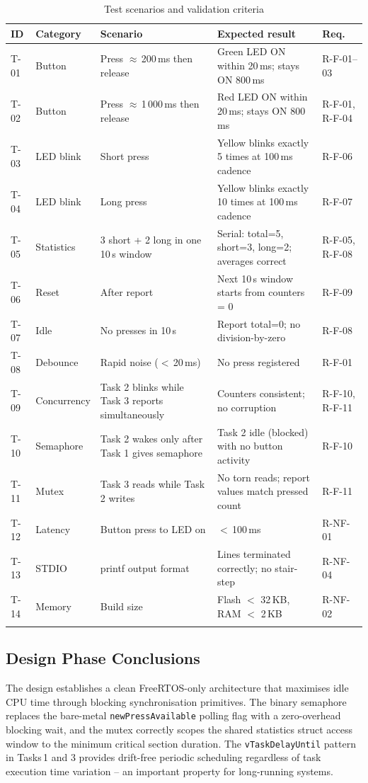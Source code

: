 \documentclass[12pt]{article}
\begin{document}
\begin{longtable}{p{1.0cm} p{2.3cm} p{4.5cm} p{4.5cm} p{1.0cm}}
\toprule
\textbf{ID} & \textbf{Category} & \textbf{Scenario} & \textbf{Expected result} & \textbf{Req.} \\
\midrule
\endfirsthead
T-01 & Button & Press $\approx$\,200\,ms then release & Green LED ON within 20\,ms; stays ON 800\,ms & R-F-01--03 \\
T-02 & Button & Press $\approx$\,1\,000\,ms then release & Red LED ON within 20\,ms; stays ON 800\,ms & R-F-01, R-F-04 \\
T-03 & LED blink & Short press & Yellow blinks exactly 5 times at 100\,ms cadence & R-F-06 \\
T-04 & LED blink & Long press & Yellow blinks exactly 10 times at 100\,ms cadence & R-F-07 \\
T-05 & Statistics & 3 short + 2 long in one 10\,s window & Serial: total=5, short=3, long=2; averages correct & R-F-05, R-F-08 \\
T-06 & Reset & After report & Next 10\,s window starts from counters = 0 & R-F-09 \\
T-07 & Idle & No presses in 10\,s & Report total=0; no division-by-zero & R-F-08 \\
T-08 & Debounce & Rapid noise ($<$\,20\,ms) & No press registered & R-F-01 \\
T-09 & Concurrency & Task 2 blinks while Task 3 reports simultaneously & Counters consistent; no corruption & R-F-10, R-F-11 \\
T-10 & Semaphore & Task 2 wakes only after Task 1 gives semaphore & Task 2 idle (blocked) with no button activity & R-F-10 \\
T-11 & Mutex & Task 3 reads while Task 2 writes & No torn reads; report values match pressed count & R-F-11 \\
T-12 & Latency & Button press to LED on & $<$\,100\,ms & R-NF-01 \\
T-13 & STDIO & printf output format & Lines terminated correctly; no stair-step & R-NF-04 \\
T-14 & Memory & Build size & Flash $<$ 32\,KB, RAM $<$ 2\,KB & R-NF-02 \\
\bottomrule
\caption{Test scenarios and validation criteria}
\label{tab:tests}
\end{longtable}

\subsection{Design Phase Conclusions}
\hspace{0.8cm} The design establishes a clean FreeRTOS-only architecture that maximises idle CPU time through blocking synchronisation primitives. The binary semaphore replaces the bare-metal \texttt{newPressAvailable} polling flag with a zero-overhead blocking wait, and the mutex correctly scopes the shared statistics struct access window to the minimum critical section duration. The \texttt{vTaskDelayUntil} pattern in Tasks\,1 and 3 provides drift-free periodic scheduling regardless of task execution time variation -- an important property for long-running systems.
\end{document}
